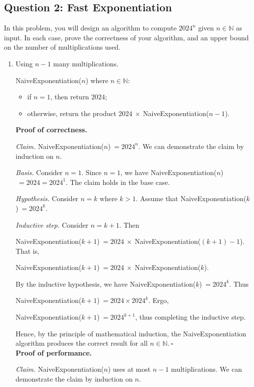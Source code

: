 \subsection*{Question 2: Fast Exponentiation}
In this problem, you will design an algorithm to compute $2024^n$ given $n \in \mathbb{N}$ as input. In each case, prove the correctness of your algorithm, and an upper bound on the number of multiplications used.
\begin{enumerate}
    \item Using $n-1$ many multiplications.
\begin{solution}
{\sc NaiveExponentiation}($n$) where $n\in\mathbb{N}$:
\begin{itemize}
\item if $n=1$, then return $2024$;
\item otherwise, return the product $2024~\times~${\sc NaiveExponentiation}($n-1$).
\end{itemize}
\textbf{Proof of correctness. }

\textit{Claim. }{\sc NaiveExponentiation}($n$)$~=2024^n$. We can demonstrate the claim by induction on $n$.

\textit{Basis. }Consider $n=1$. Since $n=1$, we have {\sc NaiveExponentiation}($n$)$~=2024=2024^1$. The claim holds in the base case.

\textit{Hypothesis. }Consider $n=k$ where $k>1$. Assume that {\sc NaiveExponentiation}($k$)$~=2024^k$.

\textit{Inductive step. }Consider $n=k+1$. Then

{\sc NaiveExponentiation}($k+1$)$~=2024~\times~${\sc NaiveExponentiation}($(k+1)-1$). That is,

{\sc NaiveExponentiation}($k+1$)$~=2024~\times~${\sc NaiveExponentiation}($k$).

By the inductive hypothesis, we have {\sc NaiveExponentiation}($k$)$~=2024^k$. Thus

{\sc NaiveExponentiation}($k+1$)$~=2024\times2024^k$. Ergo,

{\sc NaiveExponentiation}($k+1$)$~=2024^{k+1}$, thus completing the inductive step.

Hence, by the principle of mathematical induction, the {\sc NaiveExponentiation} algorithm produces the correct result for all $n\in\mathbb{N}$.$~\square$\\

\textbf{Proof of performance. }

\textit{Claim. }{\sc NaiveExponentiation}($n$) uses at most $n-1$ multiplications. We can demonstrate the claim by induction on $n$.


\end{solution}
\end{enumerate}
